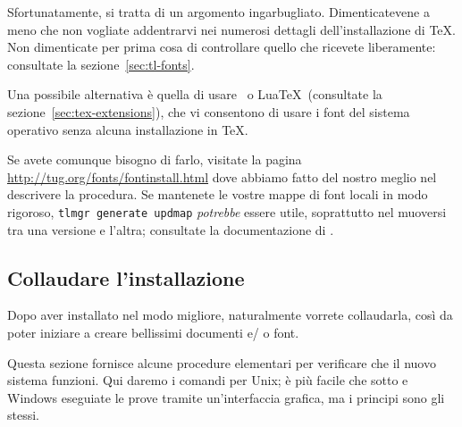 \documentclass{article}
\begin{document}
Sfortunatamente, si tratta di un argomento ingarbugliato. Dimenticatevene
a meno che non vogliate addentrarvi nei numerosi dettagli
dell'installazione di \TeX{}. Non dimenticate per prima cosa di
controllare quello che ricevete liberamente: consultate la
sezione~\ref{sec:tl-fonts}.

Una possibile alternativa è quella di usare \XeTeX\ o Lua\TeX\ (consultate
la sezione~\ref{sec:tex-extensions}), che vi consentono di usare i font
del sistema operativo senza alcuna installazione in \TeX.

Se avete comunque bisogno di farlo, visitate la pagina
\url{http://tug.org/fonts/fontinstall.html} dove abbiamo fatto del nostro
meglio nel descrivere la procedura. Se mantenete le vostre mappe di font
locali in modo rigoroso, \texttt{tlmgr generate updmap} \textit{potrebbe}
essere utile, soprattutto nel muoversi tra una versione e l'altra;
consultate la documentazione di .


\subsection{Collaudare l'installazione}
\label{sec:test-install}

Dopo aver installato \TL{} nel modo migliore, naturalmente vorrete
collaudarla, così da poter iniziare a creare bellissimi documenti e\slash
o font.

Questa sezione fornisce alcune procedure elementari per verificare che il
nuovo sistema funzioni. Qui daremo i comandi per Unix; è più facile che
sotto \MacOSX e Windows eseguiate le prove tramite un'interfaccia grafica,
ma i principi sono gli stessi.
\end{document}
